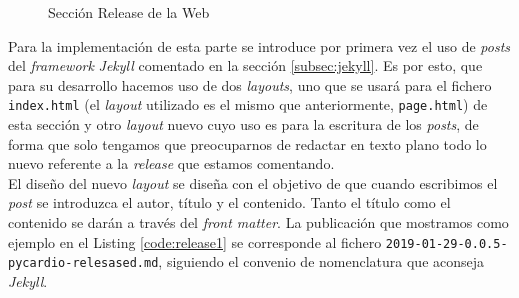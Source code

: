 \begin{figure}[H]
    \centering
    \caption{Sección Release de la Web}
    \label{fig:releaseWeb}
\end{figure}

Para la implementación de esta parte se introduce por primera vez el uso de \textit{posts} del \textit{framework} \textit{Jekyll} comentado en la sección \ref{subsec:jekyll}. Es por esto, que para su desarrollo hacemos uso de dos \textit{layouts}, uno que se usará para el fichero \texttt{index.html} (el \textit{layout} utilizado es el mismo que anteriormente, \texttt{page.html}) de esta sección y otro \textit{layout} nuevo cuyo uso es para la escritura de los \textit{posts}, de forma que solo tengamos que preocuparnos de redactar en texto plano todo lo nuevo referente a la \textit{release} que estamos comentando. \\

El diseño del nuevo \textit{layout} se diseña con el objetivo de que cuando escribimos el \textit{post} se introduzca el autor, título y el contenido. Tanto el título como el contenido se darán a través del \textit{front matter}. La publicación que mostramos como ejemplo en el Listing \ref{code:release1} se corresponde al fichero \texttt{2019-01-29-0.0.5-pycardio-relesased.md}, siguiendo el convenio de nomenclatura que aconseja \textit{Jekyll}. \\


